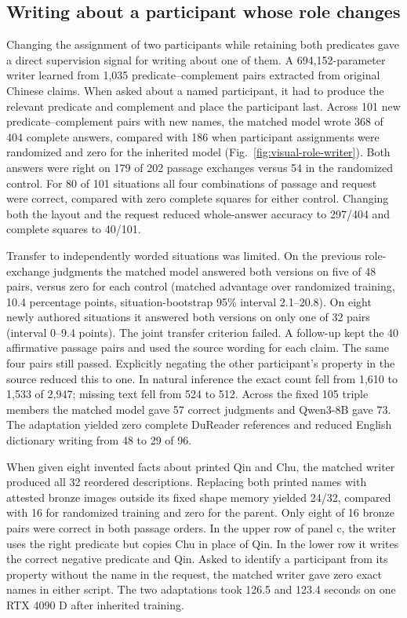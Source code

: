 \documentclass[12pt,a4paper]{article}
\providecommand{\DIFadd}[1]{{\protect\color{blue} \sf #1}} %
\begin{document}
\subsection*{\DIFadd{Writing about a participant whose role changes}}
\DIFadd{Changing the assignment of two participants while retaining both predicates gave a direct supervision signal for writing about one of them. A 694,152-parameter writer learned from 1,035 predicate--complement pairs extracted from original Chinese claims. When asked about a named participant, it had to produce the relevant predicate and complement and place the participant last. Across 101 new predicate--complement pairs with new names, the matched model wrote 368 of 404 complete answers, compared with 186 when participant assignments were randomized and zero for the inherited model (Fig.~\ref{fig:visual-role-writer}). Both answers were right on 179 of 202 passage exchanges versus 54 in the randomized control. For 80 of 101 situations all four combinations of passage and request were correct, compared with zero complete squares for either control. Changing both the layout and the request reduced whole-answer accuracy to 297/404 and complete squares to 40/101.
}

\DIFadd{Transfer to independently worded situations was limited. On the previous role-exchange judgments the matched model answered both versions on five of 48 pairs, versus zero for each control (matched advantage over randomized training, 10.4 percentage points, situation-bootstrap 95\% interval 2.1--20.8). On eight newly authored situations it answered both versions on only one of 32 pairs (interval 0--9.4 points). The joint transfer criterion failed. A follow-up kept the 40 affirmative passage pairs and used the source wording for each claim. The same four pairs still passed. Explicitly negating the other participant's property in the source reduced this to one. In natural inference the exact count fell from 1,610 to 1,533 of 2,947; missing text fell from 524 to 512. Across the fixed 105 triple members the matched model gave 57 correct judgments and Qwen3-8B gave 73. The adaptation yielded zero complete DuReader references and reduced English dictionary writing from 48 to 29 of 96.
}

\DIFadd{When given eight invented facts about printed Qin and Chu, the matched writer produced all 32 reordered descriptions. Replacing both printed names with attested bronze images outside its fixed shape memory yielded 24/32, compared with 16 for randomized training and zero for the parent. Only eight of 16 bronze pairs were correct in both passage orders. In the upper row of panel c, the writer uses the right predicate but copies Chu in place of Qin. In the lower row it writes the correct negative predicate and Qin. Asked to identify a participant from its property without the name in the request, the matched writer gave zero exact names in either script. The two adaptations took 126.5 and 123.4 seconds on one RTX 4090 D after inherited training.
}
\end{document}
